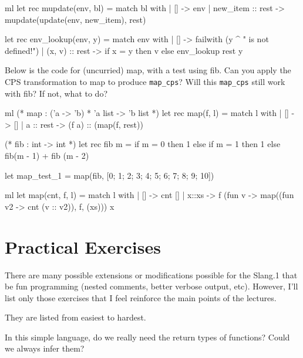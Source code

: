 \documentclass{supervision}
\begin{document}
\begin{questions}
\begin{solution}
\begin{code}{ml}
          let rec mupdate(env, bl) =
              match bl with
              | [] -> env
              | new_item :: rest -> mupdate(update(env, new_item), rest)

          let rec env_lookup(env, y) =
              match env with
              | [] -> failwith (y ^ " is not defined!\n")
              | (x, v) :: rest -> if x = y then v else env_lookup rest y
        \end{code}
      \end{solution}

    \question Below is the code for (uncurried) map, with a test using fib.
      Can you apply the CPS transformation to map to produce
      \lstinline|map_cps|? Will this \lstinline|map_cps| still work with fib?
      If not, what to do?

      \begin{code}{ml}
        (* map : ('a -> 'b) * 'a list -> 'b list *)
        let rec map(f, l) =
            match l with
            | [] -> []
            | a :: rest -> (f a) :: (map(f, rest))

        (* fib : int -> int *)
        let rec fib m =
            if m = 0
            then 1
            else if m = 1
                then 1
                else fib(m - 1) + fib (m - 2)

        let map_test_1 = map(fib, [0; 1; 2; 3; 4; 5; 6; 7; 8; 9; 10])
      \end{code}
      \begin{solution}
        \begin{code}{ml}
          let map(cnt, f, l) =
               match l with
               | [] -> cnt []
               | x::xs -> f (fun v -> map((fun v2 -> cnt (v :: v2)), f, (xs))) x
        \end{code}
      \end{solution}

    \section*{Practical Exercises}

    There are many possible extensions or modifications possible for the
    Slang.1 that be fun programming (nested comments, better verbose output,
    etc). However, I'll list only those exercises that I feel reinforce the main
    points of the lectures.

    They are listed from easiest to hardest.

    \question In this simple language, do we really need the
      return types of functions? Could we always infer them?


\end{questions}
\end{document}
